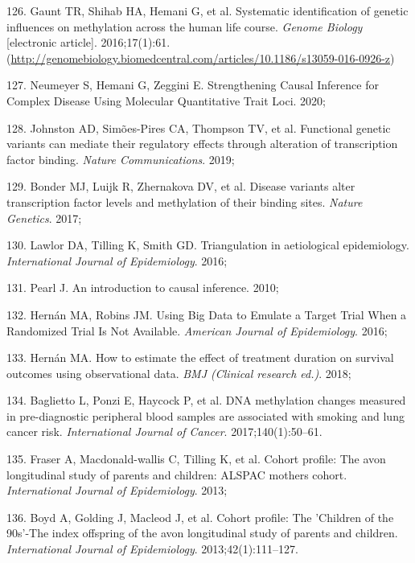 \documentclass[11pt,oneside]{bristolthesis}
\newenvironment{cslreferences}%
  {}%
  {\par}
\begin{document}
\begin{cslreferences}
\leavevmode\hypertarget{ref-Gaunt2016}{}%
126. Gaunt TR, Shihab HA, Hemani G, et al. Systematic identification of genetic influences on methylation across the human life course. \emph{Genome Biology} {[}electronic article{]}. 2016;17(1):61. (\url{http://genomebiology.biomedcentral.com/articles/10.1186/s13059-016-0926-z})

\leavevmode\hypertarget{ref-Neumeyer2020}{}%
127. Neumeyer S, Hemani G, Zeggini E. Strengthening Causal Inference for Complex Disease Using Molecular Quantitative Trait Loci. 2020;

\leavevmode\hypertarget{ref-Johnston2019}{}%
128. Johnston AD, Simões-Pires CA, Thompson TV, et al. Functional genetic variants can mediate their regulatory effects through alteration of transcription factor binding. \emph{Nature Communications}. 2019;

\leavevmode\hypertarget{ref-Bonder2017}{}%
129. Bonder MJ, Luijk R, Zhernakova DV, et al. Disease variants alter transcription factor levels and methylation of their binding sites. \emph{Nature Genetics}. 2017;

\leavevmode\hypertarget{ref-Lawlor2016}{}%
130. Lawlor DA, Tilling K, Smith GD. Triangulation in aetiological epidemiology. \emph{International Journal of Epidemiology}. 2016;

\leavevmode\hypertarget{ref-Pearl2010}{}%
131. Pearl J. An introduction to causal inference. 2010;

\leavevmode\hypertarget{ref-Hernan2016}{}%
132. Hernán MA, Robins JM. Using Big Data to Emulate a Target Trial When a Randomized Trial Is Not Available. \emph{American Journal of Epidemiology}. 2016;

\leavevmode\hypertarget{ref-Hernan2018}{}%
133. Hernán MA. How to estimate the effect of treatment duration on survival outcomes using observational data. \emph{BMJ (Clinical research ed.)}. 2018;

\leavevmode\hypertarget{ref-Baglietto2017}{}%
134. Baglietto L, Ponzi E, Haycock P, et al. DNA methylation changes measured in pre-diagnostic peripheral blood samples are associated with smoking and lung cancer risk. \emph{International Journal of Cancer}. 2017;140(1):50--61.

\leavevmode\hypertarget{ref-Fraser2013}{}%
135. Fraser A, Macdonald-wallis C, Tilling K, et al. Cohort profile: The avon longitudinal study of parents and children: ALSPAC mothers cohort. \emph{International Journal of Epidemiology}. 2013;

\leavevmode\hypertarget{ref-Boyd2013}{}%
136. Boyd A, Golding J, Macleod J, et al. Cohort profile: The 'Children of the 90s'-The index offspring of the avon longitudinal study of parents and children. \emph{International Journal of Epidemiology}. 2013;42(1):111--127.


\end{cslreferences}
\end{document}
